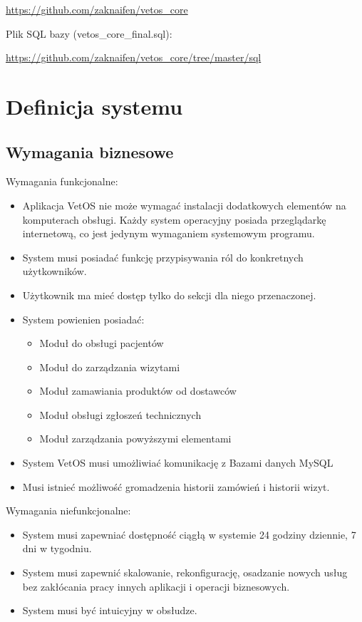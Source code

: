 \documentclass[10pt,a4paper]{article}
\begin{document}
	\url{https://github.com/zaknaifen/vetos_core}
	
\newline
Plik SQL bazy (vetos\_core\_final.sql):


\url{https://github.com/zaknaifen/vetos_core/tree/master/sql} 
	
	\section{Definicja systemu}
	\subsection{Wymagania biznesowe}
	Wymagania funkcjonalne:
	\begin{itemize}
		\item Aplikacja VetOS nie może wymagać instalacji dodatkowych elementów na komputerach obsługi. Każdy system operacyjny posiada przeglądarkę internetową, co jest jedynym wymaganiem systemowym programu.
		\item System musi posiadać funkcję przypisywania ról do konkretnych użytkowników. 
		\item Użytkownik ma mieć dostęp tylko do sekcji dla niego przenaczonej. 
		\newpage
		\item System powienien posiadać:
			\begin{itemize}
				\item Moduł do obsługi pacjentów
				\item Moduł do zarządzania wizytami
				\item Moduł zamawiania produktów od dostawców
				\item Moduł obsługi zgłoszeń technicznych 
				\item Moduł zarządzania powyższymi elementami
			\end{itemize}
		\item System VetOS musi umożliwiać komunikację z Bazami danych MySQL
		\item Musi istnieć możliwość gromadzenia historii zamówień i historii wizyt.
	\end{itemize}
	Wymagania niefunkcjonalne:
	\begin{itemize}
		\item System musi zapewniać dostępność ciągłą w systemie 24 godziny dziennie, 7 dni w tygodniu.
		\item System musi zapewnić skalowanie, rekonfigurację, osadzanie nowych usług bez zakłócania pracy innych aplikacji i operacji biznesowych.
		\item System musi być intuicyjny w obsłudze.
	\end{itemize}
\end{document}

